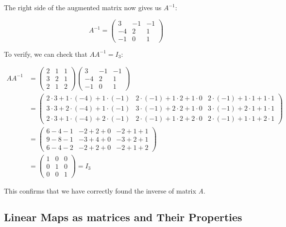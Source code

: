 The right side of the augmented matrix now gives us \(A^{-1}\):

\[
    A^{-1} = 
    \begin{pmatrix}
    3 & -1 & -1 \\
    -4 & 2 & 1 \\
    -1 & 0 & 1
    \end{pmatrix}
\]

To verify, we can check that \(AA^{-1} = I_3\):

\begin{align*}
    AA^{-1} &= 
    \begin{pmatrix}
    2 & 1 & 1 \\
    3 & 2 & 1 \\
    2 & 1 & 2
    \end{pmatrix}
    \begin{pmatrix}
    3 & -1 & -1 \\
    -4 & 2 & 1 \\
    -1 & 0 & 1
    \end{pmatrix} \\
    &= 
    \begin{pmatrix}
    2 \cdot 3 + 1 \cdot (-4) + 1 \cdot (-1) & 2 \cdot (-1) + 1 \cdot 2 + 1 \cdot 0 & 2 \cdot (-1) + 1 \cdot 1 + 1 \cdot 1 \\
    3 \cdot 3 + 2 \cdot (-4) + 1 \cdot (-1) & 3 \cdot (-1) + 2 \cdot 2 + 1 \cdot 0 & 3 \cdot (-1) + 2 \cdot 1 + 1 \cdot 1 \\
    2 \cdot 3 + 1 \cdot (-4) + 2 \cdot (-1) & 2 \cdot (-1) + 1 \cdot 2 + 2 \cdot 0 & 2 \cdot (-1) + 1 \cdot 1 + 2 \cdot 1
    \end{pmatrix} \\
    &= 
    \begin{pmatrix}
    6 - 4 - 1 & -2 + 2 + 0 & -2 + 1 + 1 \\
    9 - 8 - 1 & -3 + 4 + 0 & -3 + 2 + 1 \\
    6 - 4 - 2 & -2 + 2 + 0 & -2 + 1 + 2
    \end{pmatrix} \\
    &= 
    \begin{pmatrix}
    1 & 0 & 0 \\
    0 & 1 & 0 \\
    0 & 0 & 1
    \end{pmatrix} = I_3
\end{align*}

This confirms that we have correctly found the inverse of matrix \emph{A}.

\subsection{Linear Maps as matrices and Their Properties}

